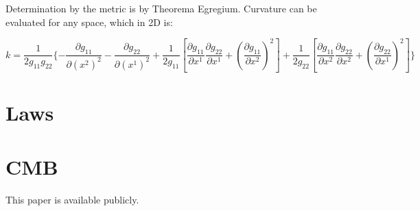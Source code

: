 \documentclass{paper}
\begin{document}
  Determination by the metric is by Theorema Egregium. Curvature can be
  evaluated for any space, which in 2D is:

  \begin{equation}
    k = \frac{1}{2 g_{11} g_{22}} \{ 
    - \frac{\partial g_{11}}{\partial (x^2)^2} 
    - \frac{\partial g_{22}}{\partial (x^1)^2}
    + \frac{1}{2 g_{11}} [ \frac{\partial g_{11}}{\partial x^1}
      \frac{\partial g_{22}}{\partial x^1} 
    + ( \frac{\partial g_{11}}{\partial x^2} )^2 ]
    + \frac{1}{2 g_{22}} [ \frac{\partial g_{11}}{\partial x^2}
      \frac{\partial g_{22}}{\partial x^2} 
    + ( \frac{\partial g_{22}}{\partial x^1} )^2 ] \} 
  \end{equation}

\section{Laws}

\section{CMB}

This paper is available publicly.\cite{Hayden_Cosmology_Source_Repo}

\pagebreak
\printbibliography
\end{document}
